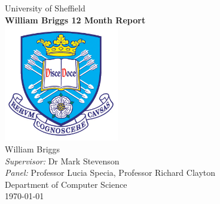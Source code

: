 \documentclass[11pt,oneside]{book}
\begin{document}
\begin{titlepage}


\begin{center}
{\LARGE University of Sheffield}\\[1.5cm]
\linespread{1.2}\huge {\bfseries William Briggs 12 Month Report}\\[1.5cm]
\linespread{1}
\includegraphics[width=5cm]{images/tuoslogo.png}\\[1cm]
{\Large William Briggs}\\[1cm]
{\large \emph{Supervisor:} Dr Mark Stevenson}\\[1cm]

{\large \emph{Panel:} Professor Lucia Specia, Professor Richard Clayton}\\[1cm]
Department of Computer Science\\[2cm]
\today
\end{center}

\end{titlepage}







\tableofcontents
\listoffigures
\listoftables


\mainmatter


 
  
 
 
 
 
% 
%
% 
 
 
\end{document}
